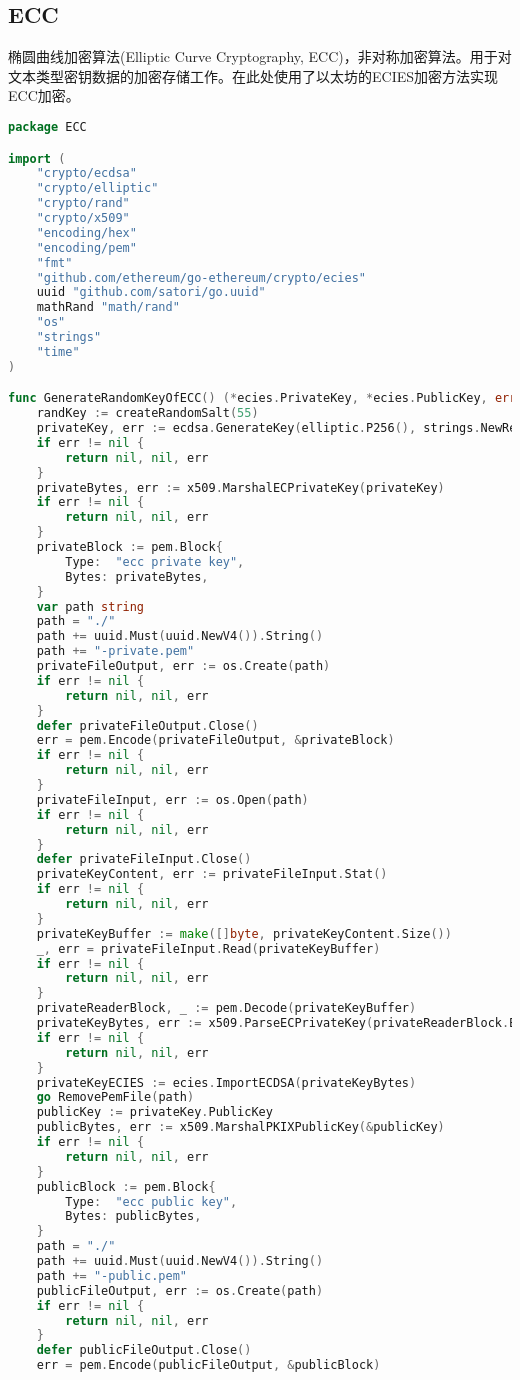 \documentclass[UTF8]{ctexart}
\begin{document}
    \subsection{ECC}
    \par
    椭圆曲线加密算法(Elliptic Curve Cryptography, ECC)，非对称加密算法。用于对文本类型密钥数据的加密存储工作。在此处使用了以太坊的ECIES加密方法实现ECC加密。
    \begin{lstlisting}[language=Go]
package ECC

import (
	"crypto/ecdsa"
	"crypto/elliptic"
	"crypto/rand"
	"crypto/x509"
	"encoding/hex"
	"encoding/pem"
	"fmt"
	"github.com/ethereum/go-ethereum/crypto/ecies"
	uuid "github.com/satori/go.uuid"
	mathRand "math/rand"
	"os"
	"strings"
	"time"
)

func GenerateRandomKeyOfECC() (*ecies.PrivateKey, *ecies.PublicKey, error) {
	randKey := createRandomSalt(55)
	privateKey, err := ecdsa.GenerateKey(elliptic.P256(), strings.NewReader(randKey))
	if err != nil {
		return nil, nil, err
	}
	privateBytes, err := x509.MarshalECPrivateKey(privateKey)
	if err != nil {
		return nil, nil, err
	}
	privateBlock := pem.Block{
		Type:  "ecc private key",
		Bytes: privateBytes,
	}
	var path string
	path = "./"
	path += uuid.Must(uuid.NewV4()).String()
	path += "-private.pem"
	privateFileOutput, err := os.Create(path)
	if err != nil {
		return nil, nil, err
	}
	defer privateFileOutput.Close()
	err = pem.Encode(privateFileOutput, &privateBlock)
	if err != nil {
		return nil, nil, err
	}
	privateFileInput, err := os.Open(path)
	if err != nil {
		return nil, nil, err
	}
	defer privateFileInput.Close()
	privateKeyContent, err := privateFileInput.Stat()
	if err != nil {
		return nil, nil, err
	}
	privateKeyBuffer := make([]byte, privateKeyContent.Size())
	_, err = privateFileInput.Read(privateKeyBuffer)
	if err != nil {
		return nil, nil, err
	}
	privateReaderBlock, _ := pem.Decode(privateKeyBuffer)
	privateKeyBytes, err := x509.ParseECPrivateKey(privateReaderBlock.Bytes)
	if err != nil {
		return nil, nil, err
	}
	privateKeyECIES := ecies.ImportECDSA(privateKeyBytes)
	go RemovePemFile(path)
	publicKey := privateKey.PublicKey
	publicBytes, err := x509.MarshalPKIXPublicKey(&publicKey)
	if err != nil {
		return nil, nil, err
	}
	publicBlock := pem.Block{
		Type:  "ecc public key",
		Bytes: publicBytes,
	}
	path = "./"
	path += uuid.Must(uuid.NewV4()).String()
	path += "-public.pem"
	publicFileOutput, err := os.Create(path)
	if err != nil {
		return nil, nil, err
	}
	defer publicFileOutput.Close()
	err = pem.Encode(publicFileOutput, &publicBlock)

\end{lstlisting}
\end{document}
